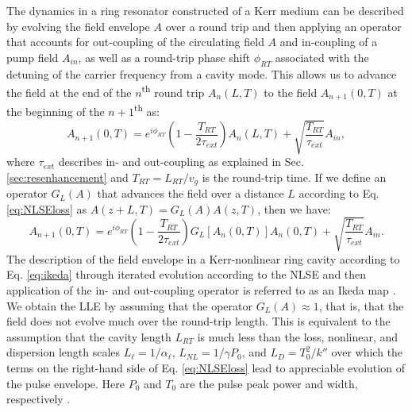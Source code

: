 The dynamics in a ring resonator constructed of a Kerr medium can be described by evolving the field envelope $A$ over a round trip and then applying an operator that accounts for out-coupling of the circulating field $A$ and in-coupling of a pump field $A_{in}$, as well as a round-trip phase shift $\phi_{RT}$ associated with the detuning of the carrier frequency from a cavity mode. This allows us to advance the field at the end of the $n$\textsuperscript{th} round trip $A_n(L,T)$ to the field $A_{n+1}(0,T)$ at the beginning of the $n+1$\textsuperscript{th} as:
\begin{equation}
A_{n+1}(0,T)=e^{i\phi_{RT}}\left(1-\frac{T_{RT}}{2\tau_{ext}}\right)A_n(L,T)+\sqrt{\frac{T_{RT}}{\tau_{ext}}}A_{in},
\end{equation}
where $\tau_{ext}$ describes in- and out-coupling as explained in Sec. \ref{sec:resenhancement} and $T_{RT}=L_{RT}/v_g$ is the round-trip time. If we define an operator $G_L(A)$ that advances the field over a distance $L$ according to Eq. \ref{eq:NLSEloss} as $A(z+L,T)=G_L(A)A(z,T)$, then we have:
\begin{equation}
A_{n+1}(0,T)=e^{i\phi_{RT}}\left(1-\frac{T_{RT}}{2\tau_{ext}}\right)G_L\left[A_n(0,T)\right]A_n(0,T)+\sqrt{\frac{T_{RT}}{\tau_{ext}}}A_{in}. \label{eq:ikeda}
\end{equation}
The description of the field envelope in a Kerr-nonlinear ring cavity according to Eq. \ref{eq:ikeda} through iterated evolution according to the NLSE and then application of the in- and out-coupling operator is referred to as an Ikeda map \cite{Ikeda1979}. We obtain the LLE by assuming that the operator $G_L(A)\approx1$, that is, that the field does not evolve much over the round-trip length. This is equivalent to the assumption that the cavity length $L_{RT}$ is much less than the loss, nonlinear, and dispersion length scales $L_\ell=1/\alpha_\ell$, $L_{NL}=1/\gamma P_0$, and $L_D=T_0^2/k''$ over which the terms on the right-hand side of Eq. \ref{eq:NLSEloss} lead to appreciable evolution of the pulse envelope. Here $P_0$ and $T_0$ are the pulse peak power and width, respectively \cite{Agrawal2007}.

